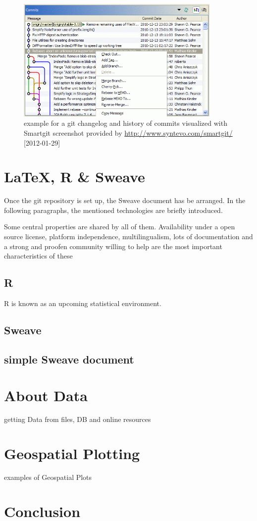 \documentclass{ifacconf}
\begin{document}
\begin{figure}[h]
\begin{center}
\includegraphics[height=6cm,angle=90]{pics/Smartgit_graphical_Log.png}    %
\caption{example for a git changelog and history of commits visualized with Smartgit \newline 
screenshot provided by \url{http://www.syntevo.com/smartgit/} [2012-01-29]} 
\label{fig:gitHistory}
\end{center}
\end{figure}

\section{\LaTeX, R \& Sweave}\label{sec:structure}

Once the git repository is set up, the Sweave document has be arranged. 
In the following paragraphs, the mentioned technologies are briefly introduced.

Some central properties are shared by all of them. Availability under a open source license, 
platform independence, multilingualism, lots of documentation and a strong and proofen 
community willing to help are the most important characteristics of these


\subsection{R}
R\cite{R} is known as an upcoming statistical environment. 



\subsection{Sweave}

\subsection{simple Sweave document}

\section{About Data}

getting Data from files, DB and online resources


\section{Geospatial Plotting}

examples of Geospatial Plots

\section{Conclusion}

\nocite{*}
   
\end{document}
